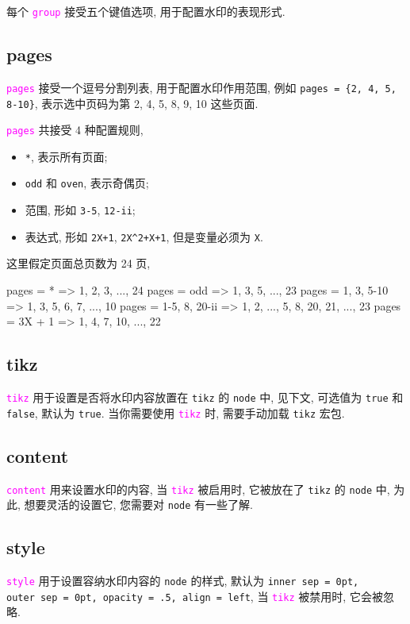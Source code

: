 \documentclass{article}
\newcounter{example}
\def\opt#1{\textcolor{magenta}{\texttt{#1}}}
\def\para#1{\textcolor[rgb]{0.13, 0.67, 0.8}{\texttt{#1}}}
\begin{document}
每个 \opt{group} 接受五个键值选项, 用于配置水印的表现形式.

\subsection{pages}
\opt{pages} 接受一个逗号分割列表, 用于配置水印作用范围, 例如 \verb|pages = {2, 4, 5, 8-10}|, 表示选中页码为第 2, 4, 5, 8, 9, 10 这些页面.

\opt{pages} 共接受 4 种配置规则, 
\begin{itemize}
  \item \para{*}, 表示所有页面;
  \item \para{odd} 和 \para{oven}, 表示奇偶页;
  \item 范围, 形如 \para{3-5}, \para{12-ii};
  \item 表达式, 形如 \para{2X+1}, \para{2X\^{}2+X+1}, 但是变量必须为 \para{X}.
\end{itemize}

这里假定页面总页数为 24 页, 
\begin{example}[title = pages 配置规则]
pages = {*}              =>     1, 2, 3, ..., 24
pages = {odd}            =>     1, 3, 5, ..., 23
pages = {1, 3, 5-10}     =>     1, 3, 5, 6, 7, ..., 10
pages = {1-5, 8, 20-ii}  =>     1, 2, ..., 5, 8, 20, 21, ..., 23
pages = {3X + 1}         =>     1, 4, 7, 10, ..., 22
\end{example}

\subsection{tikz}
\opt{tikz} 用于设置是否将水印内容放置在  \texttt{tikz} 的 \texttt{node} 中, 见下文, 可选值为 \para{true} 和 \para{false}, 默认为 \para{true}. 当你需要使用 \opt{tikz} 时, 需要手动加载 \texttt{tikz} 宏包.

\subsection{content}
\opt{content} 用来设置水印的内容, 当 \opt{tikz} 被启用时, 它被放在了 \texttt{tikz} 的 \texttt{node} 中, 为此, 想要灵活的设置它, 您需要对 \texttt{node} 有一些了解.

\subsection{style}
\opt{style} 用于设置容纳水印内容的 \texttt{node} 的样式, 默认为 \para{inner~sep = 0pt, outer~sep = 0pt, opacity = .5, align = left}, 当 \opt{tikz} 被禁用时, 它会被忽略.
\end{document}
